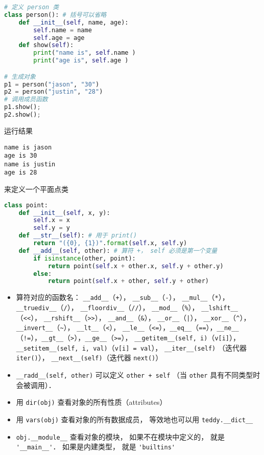 
\begin{issues}
\issueDraft
\end{issues}


\begin{lstlisting}[language=python]
# 定义 person 类
class person(): # 括号可以省略
    def __init__(self, name, age): 
        self.name = name 
        self.age = age 
    def show(self): 
        print("name is", self.name ) 
        print("age is", self.age ) 

# 生成对象
p1 = person("jason", "30") 
p2 = person("justin", "28")
# 调用成员函数
p1.show();
p2.show();
\end{lstlisting}
运行结果
\begin{lstlisting}
name is jason
age is 30
name is justin
age is 28
\end{lstlisting}

来定义一个平面点类
\begin{lstlisting}[language=python]
class point:
    def __init__(self, x, y): 
        self.x = x 
        self.y = y 
    def __str__(self): # 用于 print()
        return "({0}, {1})".format(self.x, self.y)
    def __add__(self, other): # 算符 +， self 必须是第一个变量
        if isinstance(other, point):
            return point(self.x + other.x, self.y + other.y)
        else:
            return point(self.x + other, self.y + other)
\end{lstlisting}
\begin{itemize}
\item 算符对应的函数名： \verb|__add__|（\verb|+|）， \verb|__sub__|（\verb|-|）， \verb|__mul__|（\verb|*|）， \verb|__truediv__|（\verb|/|）， \verb|__floordiv__|（\verb|//|）， \verb|__mod__|（\verb|%|）， \verb|__lshift__|（\verb|<<|）， \verb|__rshift__|（\verb|>>|）， \verb|__and__|（\verb|&|）， \verb|__or__|（\verb`|`）， \verb|__xor__|（\verb|^|）， \verb|__invert__|（\verb|~|）， \verb|__lt__|（\verb|<|）， \verb|__le__|（\verb|<=|），\verb|__eq__|（\verb|==|），\verb|__ne__|（\verb|!=|），\verb|__gt__|（\verb|>|），\verb|__ge__|（\verb|>=|）， \verb|__getitem__(self, i)|（\verb|v[i]|）， \verb|__setitem__(self, i, val)|（\verb|v[i] = val|）， \verb|__iter__(self)| （迭代器 \verb|iter()|）， \verb|__next__(self)|（迭代器 \verb|next()|）
\item \verb|__radd__(self, other)| 可以定义 \verb|other + self| （当 \verb|other| 具有不同类型时会被调用）．
\item 用 \verb|dir(obj)| 查看对象的所有性质（attributes）
\item 用 \verb|vars(obj)| 查看对象的所有数据成员， 等效地也可以用 \verb|teddy.__dict__|
\item \verb|obj.__module__| 查看对象的模块， 如果不在模块中定义的， 就是 \verb|'__main__'|． 如果是内建类型， 就是 \verb|'builtins'|
\end{itemize}
